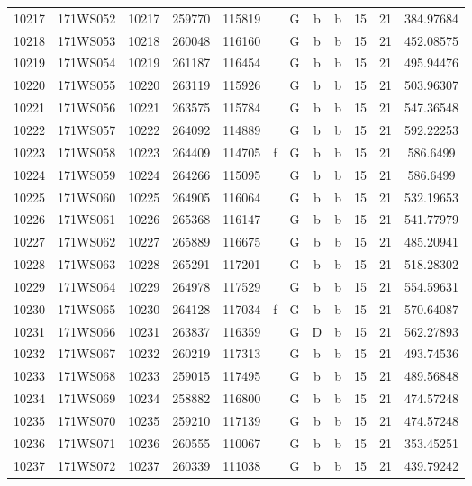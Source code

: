 \begin{tabular}{|*{12}{c|}}
10217 & 171WS052 & 10217 & 259770 & 115819 &  & G & b & b & 15 & 21 & 384.97684 \\ 
10218 & 171WS053 & 10218 & 260048 & 116160 &  & G & b & b & 15 & 21 & 452.08575 \\ 
10219 & 171WS054 & 10219 & 261187 & 116454 &  & G & b & b & 15 & 21 & 495.94476 \\ 
10220 & 171WS055 & 10220 & 263119 & 115926 &  & G & b & b & 15 & 21 & 503.96307 \\ 
10221 & 171WS056 & 10221 & 263575 & 115784 &  & G & b & b & 15 & 21 & 547.36548 \\ 
10222 & 171WS057 & 10222 & 264092 & 114889 &  & G & b & b & 15 & 21 & 592.22253 \\ 
10223 & 171WS058 & 10223 & 264409 & 114705 & f & G & b & b & 15 & 21 & 586.6499 \\ 
10224 & 171WS059 & 10224 & 264266 & 115095 &  & G & b & b & 15 & 21 & 586.6499 \\ 
10225 & 171WS060 & 10225 & 264905 & 116064 &  & G & b & b & 15 & 21 & 532.19653 \\ 
10226 & 171WS061 & 10226 & 265368 & 116147 &  & G & b & b & 15 & 21 & 541.77979 \\ 
10227 & 171WS062 & 10227 & 265889 & 116675 &  & G & b & b & 15 & 21 & 485.20941 \\ 
10228 & 171WS063 & 10228 & 265291 & 117201 &  & G & b & b & 15 & 21 & 518.28302 \\ 
10229 & 171WS064 & 10229 & 264978 & 117529 &  & G & b & b & 15 & 21 & 554.59631 \\ 
10230 & 171WS065 & 10230 & 264128 & 117034 & f & G & b & b & 15 & 21 & 570.64087 \\ 
10231 & 171WS066 & 10231 & 263837 & 116359 &  & G & D & b & 15 & 21 & 562.27893 \\ 
10232 & 171WS067 & 10232 & 260219 & 117313 &  & G & b & b & 15 & 21 & 493.74536 \\ 
10233 & 171WS068 & 10233 & 259015 & 117495 &  & G & b & b & 15 & 21 & 489.56848 \\ 
10234 & 171WS069 & 10234 & 258882 & 116800 &  & G & b & b & 15 & 21 & 474.57248 \\ 
10235 & 171WS070 & 10235 & 259210 & 117139 &  & G & b & b & 15 & 21 & 474.57248 \\ 
10236 & 171WS071 & 10236 & 260555 & 110067 &  & G & b & b & 15 & 21 & 353.45251 \\ 
10237 & 171WS072 & 10237 & 260339 & 111038 &  & G & b & b & 15 & 21 & 439.79242 \\ 

\end{tabular}
